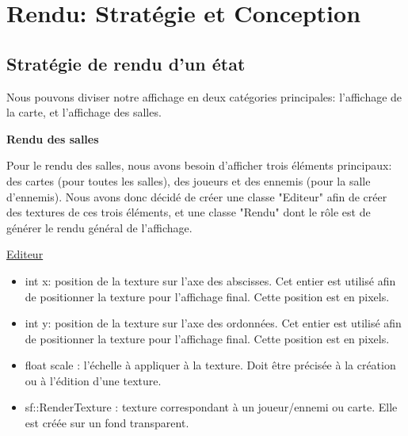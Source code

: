 \section{Rendu: Stratégie et Conception}

\subsection{Stratégie de rendu d'un état}

Nous pouvons diviser notre affichage en deux catégories principales: l'affichage de la carte, et l'affichage des salles.

\textbf{Rendu des salles}

Pour le rendu des salles, nous avons besoin d'afficher trois éléments principaux: des cartes (pour toutes les salles), des joueurs et des ennemis (pour la salle d'ennemis). Nous avons donc décidé de créer une classe "Editeur" afin de créer des textures de ces trois éléments, et une classe "Rendu" dont le rôle est de générer le rendu général de l'affichage.

\underline{Editeur}
\begin{itemize}
    \item int x: position de la texture sur l'axe des abscisses. Cet entier est utilisé afin de positionner la texture pour l'affichage final. Cette position est en pixels.
    \item int y: position de la texture sur l'axe des ordonnées. Cet entier est utilisé afin de positionner la texture pour l'affichage final. Cette position est en pixels.
    \item float scale : l'échelle à appliquer à la texture. Doit être précisée à la création ou à l'édition d'une texture.
    \item sf::RenderTexture : texture correspondant à un joueur/ennemi ou carte. Elle est créée sur un fond transparent.
\end{itemize}

